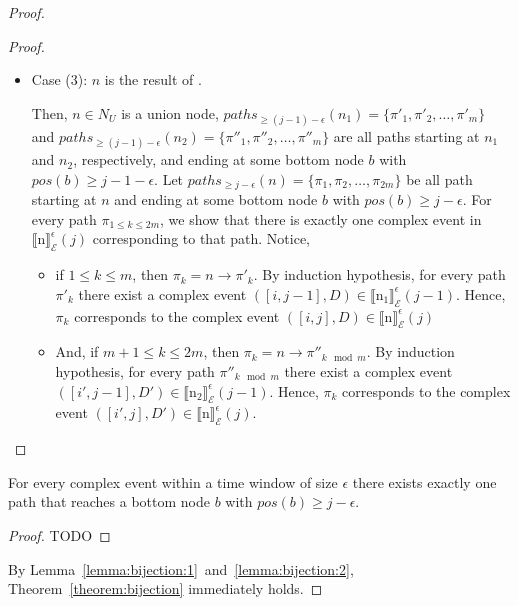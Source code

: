 \begin{proof}
\begin{proof}
\begin{itemize}
  \item Case (3): $n$ is the result of .

        Then, $n \in N_{U}$ is a union node, $paths_{\ge (j - 1) - \epsilon}(n_{1}) = \{ \pi'_{1},\pi'_{2},\ldots, \pi'_{m} \}$ and $paths_{\ge (j - 1) - \epsilon}(n_{2}) = \{ \pi''_{1},\pi''_{2},\ldots, \pi''_{m} \}$ are all paths starting at $n_{1}$ and $n_{2}$, respectively, and ending at some bottom node $b$ with $pos(b) \ge j - 1 - \epsilon$. Let $paths_{\ge j - \epsilon}(n) = \{ \pi_{1}, \pi_{2},\ldots, \pi_{2m} \}$ be all path starting at $n$ and ending at some bottom node $b$ with $pos(b) \ge j - \epsilon$. For every path $\pi_{1 \le k \le 2m}$, we show that there is exactly one complex event in ${\llbracket \text{n} \rrbracket}^{\epsilon}_{\mathcal{E}}(j)$ corresponding to that path. Notice,

        \begin{itemize}
          \item if $1 \leq k \leq m $, then $\pi_{k} = n \rightarrow \pi'_{k}$. By induction hypothesis, for every path $\pi'_{k}$ there exist a complex event $([i, j-1], D) \in {\llbracket \text{n}_{1} \rrbracket}^{\epsilon}_{\mathcal{E}}(j-1)$. Hence, $\pi_{k}$ corresponds to the complex event $([i, j], D) \in {\llbracket \text{n} \rrbracket}^{\epsilon}_{\mathcal{E}}(j)$

          \item And, if $m+1 \leq k \leq 2m $, then $\pi_{k} = n \rightarrow \pi''_{k \mod m}$. By induction hypothesis, for every path $\pi''_{k \mod m}$ there exist a complex event $([i', j-1], D') \in {\llbracket \text{n}_{2} \rrbracket}^{\epsilon}_{\mathcal{E}}(j-1)$. Hence, $\pi_{k}$ corresponds to the complex event $([i', j], D') \in {\llbracket \text{n} \rrbracket}^{\epsilon}_{\mathcal{E}}(j)$.
        \end{itemize}
\end{itemize}
\end{proof}

\begin{lemma}\label{lemma:bijection:2}
  For every complex event within a time window of size $\epsilon$ there exists exactly one path that reaches a bottom node $b$ with $pos(b) \ge j - \epsilon$.
\end{lemma}

\begin{proof}
  TODO
\end{proof}

By Lemma~\ref{lemma:bijection:1}~and~\ref{lemma:bijection:2}, Theorem~\ref{theorem:bijection} immediately holds.

\end{proof}
